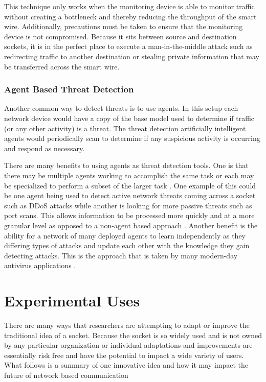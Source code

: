 \documentclass[conference, 12pt]{IEEEtran}
\begin{document}
This technique only works when the monitoring device is able to monitor traffic without creating a bottleneck and thereby reducing the throughput of the smart wire. Additionally, precautions must be taken to ensure that the monitoring device is not compromised. Because it sits between source and destination sockets, it is in the perfect place to execute a man-in-the-middle attack such as redirecting traffic to another destination or stealing private information that may be transferred across the smart wire.

\subsubsection{Agent Based Threat Detection}
Another common way to detect threats is to use agents. In this setup each network device would have a copy of the base model used to determine if traffic (or any other activity) is a threat. The threat detection artificially intelligent agents would periodically scan to determine if any suspicious activity is occurring and respond as necessary.

There are many benefits to using agents as threat detection tools. One is that there may be multiple agents working to accomplish the same task or each may be specialized to perform a subset of the larger task \cite{Arabo}. One example of this could be one agent being used to detect active network threats coming across a socket such as DDoS attacks while another is looking for more passive threats such as port scans. This allows information to be processed more quickly and at a more granular level as opposed to a non-agent based approach \cite{Arabo}. Another benefit is the ability for a network of many deployed agents to learn independently as they differing types of attacks and update each other with the knowledge they gain detecting attacks. This is the approach that is taken by many modern-day antivirus applications \cite{Arabo}.

\section{Experimental Uses}
There are many ways that researchers are attempting to adapt or improve the traditional idea of a socket. Because the socket is so widely used and is not owned by any particular organization or individual adaptations and improvements are essentially risk free and have the potential to impact a wide variety of users. What follows is a summary of one innovative idea and how it may impact the future of network based communication
\end{document}
